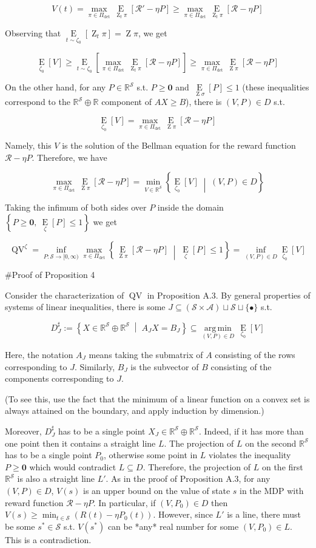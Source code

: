 \documentclass[a4paper]{article}
\newcommand{\AP}[1]{\left(#1\right)}
\newcommand{\AB}[1]{\left[#1\right]}
\newcommand{\AC}[1]{\left\{#1\right\}}
\newcommand{\ACM}[2]{\left\{#1\;\middle\vert\;#2\right\}}
\newcommand{\Ea}[2]{\underset{#1}{\operatorname{E}}\AB{#2}}
\newcommand{\Argmin}[1]{\underset{#1}{\operatorname{arg\,min}}\,}
\newcommand{\Reals}{\mathbb{R}}
\newcommand{\A}{\mathcal{A}}
\newcommand{\St}{\mathcal{S}}
\newcommand{\R}{\mathcal{R}}
\newcommand{\Pe}{P}
\newcommand{\QV}{\operatorname{QV}}
\DeclareMathOperator{\Z}{Z}
\begin{document}
$$V(t) = \max_{\pi\in\Pi_{\det}}{\Ea{\Z_t\pi}{\R'-\eta P}} \geq \max_{\pi\in\Pi_{\det}}{\Ea{\Z_t\pi}{\R-\eta P}}$$

Observing that $\Ea{t\sim\zeta_0}{\Z_t\pi} = \Z\pi$, we get

$$\Ea{\zeta_0}{V} \geq \Ea{t\sim\zeta_0}{\max_{\pi\in\Pi_{\det}}{\Ea{\Z_t\pi}{\R-\eta P}}} \geq \max_{\pi\in\Pi_{\det}} \Ea{\Z\pi}{\R - \eta P}$$

On the other hand, for any $P\in\Reals^\St$ s.t. $P\geq\boldsymbol{0}$ and $\Ea{\Z\sigma}{P} \leq 1$ (these inequalities correspond to the $\Reals^\St\oplus\Reals$ component of $AX \geq B$), there is $(V,P)\in D$ s.t.

$$\Ea{\zeta_0}{V} = \max_{\pi\in\Pi_{\det}} \Ea{\Z\pi}{\R - \eta P}$$

Namely, this $V$ is the solution of the Bellman equation for the reward function $\R-\eta P$. Therefore, we have

$$\max_{\pi\in\Pi_{\det}} \Ea{\Z\pi}{\R - \eta P} = \min_{V\in\Reals^\St}\ACM{\Ea{\zeta_0}{V}}{(V,P)\in D}$$

Taking the infimum of both sides over $P$ inside the domain $\AC{P\geq\boldsymbol{0},\ \Ea{\zeta}{P} \leq 1}$ we get

$$\QV^\zeta = \inf_{\Pe:\St\rightarrow[0,\infty)}\max_{\pi \in \Pi_{\det}}\ACM{\Ea{\Z\pi}{\R-\eta\Pe}}{\Ea{\zeta}{\Pe}\leq1} = \inf_{(V,P) \in D}{\Ea{\zeta_0}{V}}$$

\#Proof of Proposition 4

Consider the characterization of $\QV$ in Proposition A.3. By general properties of systems of linear inequalities, there is some $J \subseteq (\St \times \A) \sqcup \St \sqcup \{\bullet\}$ s.t.

$$D^\sharp_J := \ACM{X \in \Reals^\St \oplus \Reals^\St}{A_J X = B_J} \subseteq \Argmin{(V,P) \in D}{\Ea{\zeta_0}{V}}$$

Here, the notation $A_J$ means taking the submatrix of $A$ consisting of the rows corresponding to $J$. Similarly, $B_J$ is the subvector of $B$ consisting of the components corresponding to $J$.

(To see this, use the fact that the minimum of a linear function on a convex set is always attained on the boundary, and apply induction by dimension.)

Moreover, $D_J^\sharp$ has to be a single point $X_J \in \Reals^\St \oplus \Reals^\St$. Indeed, if it has more than one point then it contains a straight line $L$. The projection of $L$ on the second $\Reals^\St$ has to be a single point $P_0$, otherwise some point in $L$ violates the inequality $P \geq \boldsymbol{0}$ which would contradict $L \subseteq D$. Therefore, the projection of $L$ on the first $\Reals^\St$ is also a straight line $L'$. As in the proof of Proposition A.3, for any $(V,P) \in D$, $V(s)$ is an upper bound on the value of state $s$ in the MDP with reward function $\R-\eta P$. In particular, if $\AP{V,P_0} \in D$ then $V(s) \geq \min_{t\in\St} \AP{R(t)-\eta P_0(t)}$. However, since $L'$ is a line, there must be some $s^*\in\St$ s.t. $V\AP{s^*}$ can be *any* real number for some $\AP{V,P_0} \in L$. This is a contradiction.
\end{document}
